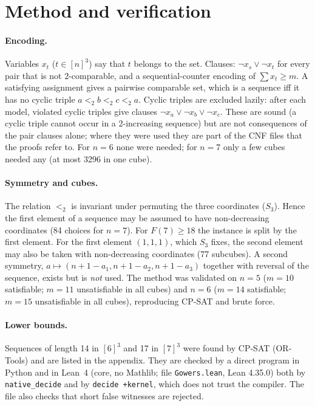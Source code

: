 \documentclass[11pt]{article}
\begin{document}
\section{Method and verification}
\paragraph{Encoding.} Variables $x_t$ ($t\in[n]^3$) say that $t$ belongs to the set. Clauses: $\neg x_s\vee\neg x_t$ for every pair that is not $2$-comparable, and a sequential-counter encoding of $\sum x_t\ge m$. A satisfying assignment gives a pairwise comparable set, which is a sequence iff it has no cyclic triple $a<_2b<_2c<_2a$. Cyclic triples are excluded lazily: after each model, violated cyclic triples give clauses $\neg x_a\vee\neg x_b\vee\neg x_c$. These are sound (a cyclic triple cannot occur in a 2-increasing sequence) but are not consequences of the pair clauses alone; where they were used they are part of the CNF files that the proofs refer to. For $n=6$ none were needed; for $n=7$ only a few cubes needed any (at most 3296 in one cube).

\paragraph{Symmetry and cubes.} The relation $<_2$ is invariant under permuting the three coordinates ($S_3$). Hence the first element of a sequence may be assumed to have non-decreasing coordinates (84 choices for $n=7$). For $F(7)\ge18$ the instance is split by the first element. For the first element $(1,1,1)$, which $S_3$ fixes, the second element may also be taken with non-decreasing coordinates (77 subcubes). A second symmetry, $a\mapsto(n+1-a_1,n+1-a_2,n+1-a_3)$ together with reversal of the sequence, exists but is \emph{not} used. The method was validated on $n=5$ ($m=10$ satisfiable; $m=11$ unsatisfiable in all cubes) and $n=6$ ($m=14$ satisfiable; $m=15$ unsatisfiable in all cubes), reproducing CP-SAT and brute force.

\paragraph{Lower bounds.} Sequences of length 14 in $[6]^3$ and 17 in $[7]^3$ were found by CP-SAT (OR-Tools) and are listed in the appendix. They are checked by a direct program in Python and in Lean~4 (core, no Mathlib; file \texttt{Gowers.lean}, Lean 4.35.0) both by \texttt{native\_decide} and by \texttt{decide +kernel}, which does not trust the compiler. The file also checks that short false witnesses are rejected.
\end{document}

